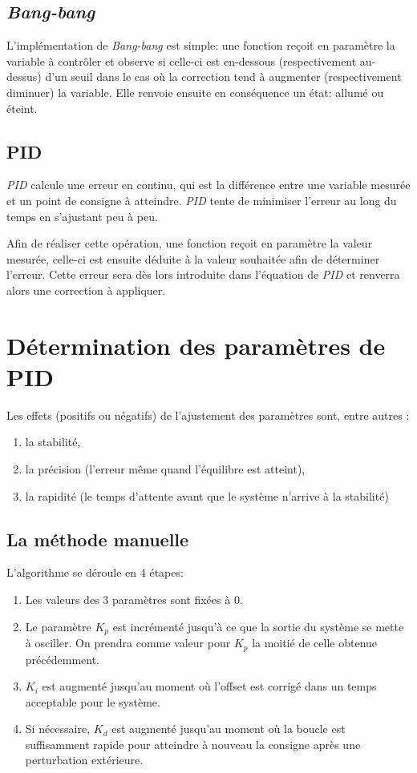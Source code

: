 \documentclass[a4paper,10pt]{report}
\begin{document}
\subsection{\emph{Bang-bang}}

L'implémentation de \emph{Bang-bang} est simple: une fonction reçoit en paramètre la variable à contrôler et observe si celle-ci est en-dessous (respectivement au-dessus) d'un seuil dans le cas où la correction tend à augmenter (respectivement diminuer) la variable. Elle renvoie ensuite en conséquence un état: allumé ou éteint.

\subsection{PID}

\emph{PID} calcule une erreur en continu, qui est la différence entre une variable mesurée et un point de consigne à atteindre.
\emph{PID} tente de minimiser l'erreur au long du temps en s'ajustant peu à peu.

Afin de réaliser cette opération, une fonction reçoit en paramètre la valeur mesurée, celle-ci est ensuite déduite à la valeur souhaitée afin de déterminer l'erreur. Cette erreur sera dès lors introduite dans l'équation de \emph{PID} et renverra alors une correction à appliquer.

\section{Détermination des paramètres de PID} %
Les effets (positifs ou négatifs) de l'ajustement des paramètres sont, entre autres \cite{zhong2006pid} :
\begin{enumerate}
\item la stabilité,
\item la précision (l'erreur même quand l'équilibre est atteint),
\item la rapidité (le temps d'attente avant que le système n'arrive à la stabilité)
\end{enumerate}

\subsection{La méthode manuelle}

L'algorithme se déroule en 4 étapes:
\begin{enumerate}
    \item Les valeurs des 3 paramètres sont fixées à $0$.
    \item Le paramètre $K_p$ est incrémenté jusqu'à ce que la sortie du système se mette à osciller.
    On prendra comme valeur pour $K_p$ la moitié de celle obtenue précédemment.
    \item $K_i$ est augmenté jusqu'au moment où l'offset est corrigé dans un temps acceptable pour le système.
    \item Si nécessaire, $K_d$ est augmenté jusqu'au moment où la boucle est suffisamment rapide pour atteindre à nouveau la consigne après une perturbation extérieure.
\end{enumerate}
\end{document}
